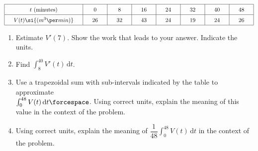  \begin{align*}
    \arraycolsep=16.5pt\def\arraystretch{1.5}
    \begin{array}{|c|c|c|c|c|c|c|c|}
        \hline
        t \text{ (minutes)} & 0 & 8 & 16 & 24 & 32 & 40 & 48 \\ \hline
        V(t) \si{(m^3 \per min)} & 26 & 32 & 43 & 24 & 19 & 24 & 26 \\
        \hline
    \end{array}
\end{align*}
\begin{enumerate}[label=\hspace{11pt}(\alph*), align=left, leftmargin=*, labelsep=0.25em]
    \item Estimate $V'(7)$. Show the work that leads to your answer. Indicate the units. 
    \item Find $\int_8^{40} V'(t) \,\mathrm{d}t$. 
    \item Use a trapezoidal sum with sub-intervals indicated by the table to approximate \\ $\int_0^{48} V(t) \,\mathrm{d}t \forcespace$. Using correct units, explain the meaning of this value in the context of the problem.
    \item Using correct units, explain the meaning of $\dfrac{1}{48}\int_0^{48} V(t) \,\mathrm{d}t$ in the context of the problem.
\end{enumerate} \vspace{11pt}

